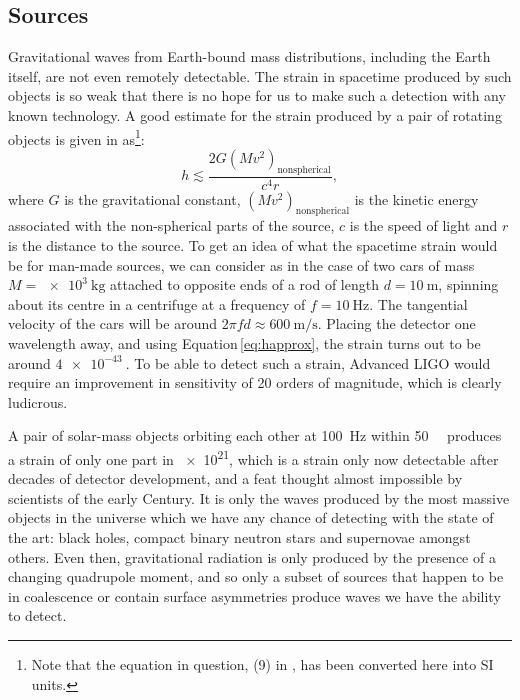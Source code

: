 \subsection{Sources}
Gravitational waves from Earth-bound mass distributions, including the Earth itself, are not even remotely detectable. The strain in spacetime produced by such objects is so weak that there is no hope for us to make such a detection with any known technology. A good estimate for the strain produced by a pair of rotating objects is given in \cite{Sathyaprakash2009} as\footnote{Note that the equation in question, (9) in \cite{Sathyaprakash2009}, has been converted here into SI units.}:
\begin{equation}
  \label{eq:happrox}
  h \lesssim \frac{2 G \left( M v^{2} \right)_{\text{nonspherical}}}{c^4 r},
\end{equation}
where $G$ is the gravitational constant, $\left( M v^{2} \right)_{\text{nonspherical}}$ is the kinetic energy associated with the non-spherical parts of the source, $c$ is the speed of light and $r$ is the distance to the source. To get an idea of what the spacetime strain would be for man-made sources, we can consider as in \cite{Sathyaprakash2009} the case of two cars of mass $M = \SI{e3}{\kilo\gram}$ attached to opposite ends of a rod of length $d = \SI{10}{\meter}$, spinning about its centre in a centrifuge at a frequency of $f = \SI{10}{\hertz}$. The tangential velocity of the cars will be around $2 \pi f d \approx \SI{600}{\meter\per\second}$. Placing the detector one wavelength away, and using Equation\,\ref{eq:happrox}, the strain turns out to be around $\SI{4e-43}{}$. To be able to detect such a strain, Advanced LIGO would require an improvement in sensitivity of \SI{20}{} orders of magnitude, which is clearly ludicrous.

A pair of solar-mass objects orbiting each other at \SI{100}{\hertz} within \SI{50}{\mega\lightyear} produces a strain of only one part in \SI{e21}{}, which is a strain only now detectable after decades of detector development, and a feat thought almost impossible by scientists of the early  Century. It is only the waves produced by the most massive objects in the universe which we have any chance of detecting with the state of the art: black holes, compact binary neutron stars and supernovae amongst others. Even then, gravitational radiation is only produced by the presence of a changing quadrupole moment, and so only a subset of sources that happen to be in coalescence or contain surface asymmetries produce waves we have the ability to detect.

